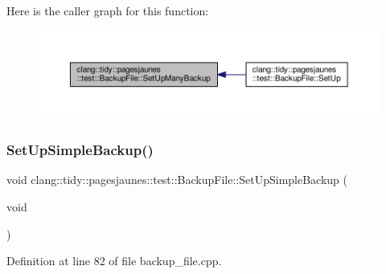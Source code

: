 Here is the caller graph for this function\+:
\nopagebreak
\begin{figure}[H]
\begin{center}
\leavevmode
\includegraphics[width=350pt]{classclang_1_1tidy_1_1pagesjaunes_1_1test_1_1_backup_file_a88f365e11813a35d63d07fcf832b3c85_icgraph}
\end{center}
\end{figure}
\mbox{\label{classclang_1_1tidy_1_1pagesjaunes_1_1test_1_1_backup_file_aff6562634de2e56533cb1220894c9b90}} 
\subsubsection{\texorpdfstring{Set\+Up\+Simple\+Backup()}{SetUpSimpleBackup()}}
{\footnotesize\ttfamily void clang\+::tidy\+::pagesjaunes\+::test\+::\+Backup\+File\+::\+Set\+Up\+Simple\+Backup (\begin{DoxyParamCaption}\item[{void}]{ }\end{DoxyParamCaption})\hspace{0.3cm}{\ttfamily [virtual]}}



Definition at line 82 of file backup\+\_\+file.\+cpp.

